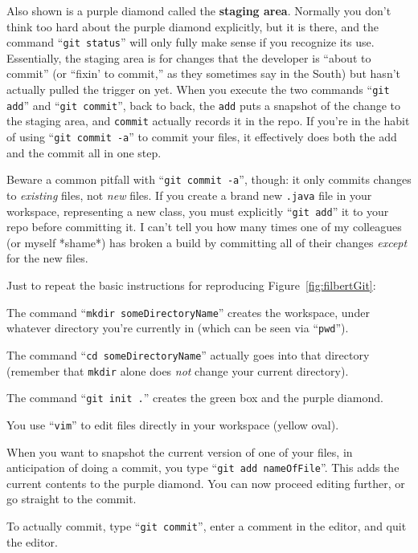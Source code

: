 Also shown is a purple diamond called the \textbf{staging area}. Normally you
don't think too hard about the purple diamond explicitly, but it is there, and
the command ``\texttt{git status}'' will only fully make sense if you recognize
its use. Essentially, the staging area is for changes that the developer is
``about to commit'' (or ``fixin' to commit,'' as they sometimes say in the
South) but hasn't actually pulled the trigger on yet. When you execute the two
commands ``\texttt{git add}'' and ``\texttt{git commit}'', back to back, the
\texttt{add} puts a snapshot of the change to the staging area, and
\texttt{commit} actually records it in the repo. If you're in the habit of
using ``\texttt{git commit -a}'' to commit your files, it effectively does both
the add and the commit all in one step.

\label{commitPitfall}
Beware a common pitfall with ``\texttt{git commit -a}'', though: it only
commits changes to \textit{existing} files, not \textit{new} files. If you
create a brand new \texttt{.java} file in your workspace, representing a new
class, you must explicitly ``\texttt{git add}'' it to your repo before
committing it. I can't tell you how many times one of my colleagues (or myself
*shame*) has broken a build by committing all of their changes \textit{except}
for the new files.

Just to repeat the basic instructions for reproducing
Figure~\ref{fig:filbertGit}:

\begin{compactenum}
\item The command ``\texttt{mkdir someDirectoryName}'' creates the workspace,
under whatever directory you're currently in (which can be seen via
``\texttt{pwd}'').
\item The command ``\texttt{cd someDirectoryName}'' actually goes into that
directory (remember that \texttt{mkdir} alone does \textit{not} change your
current directory).
\item The command ``\texttt{git init .}'' creates the green box and the purple
diamond.
\item You use ``\texttt{vim}'' to edit files directly in your workspace (yellow
oval).
\item When you want to snapshot the current version of one of your files, in
anticipation of doing a commit, you type ``\texttt{git add nameOfFile}''. This
adds the current contents to the purple diamond. You can now proceed editing
further, or go straight to the commit.
\item To actually commit, type ``\texttt{git commit}'', enter a comment in the
editor, and quit the editor.
\end{compactenum}

